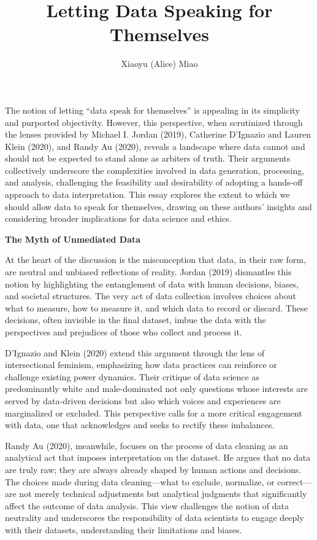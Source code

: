 \documentclass[
  letterpaper,
  DIV=11,
  numbers=noendperiod]{scrartcl}
\title{Letting Data Speaking for Themselves}
\author{Xiaoyu (Alice) Miao}
\date{}
\begin{document}
\maketitle

The notion of letting ``data speak for themselves'' is appealing in its
simplicity and purported objectivity. However, this perspective, when
scrutinized through the lenses provided by Michael I. Jordan (2019),
Catherine D'Ignazio and Lauren Klein (2020), and Randy Au (2020),
reveals a landscape where data cannot and should not be expected to
stand alone as arbiters of truth. Their arguments collectively
underscore the complexities involved in data generation, processing, and
analysis, challenging the feasibility and desirability of adopting a
hands-off approach to data interpretation. This essay explores the
extent to which we should allow data to speak for themselves, drawing on
these authors' insights and considering broader implications for data
science and ethics.

\textbf{The Myth of Unmediated Data}

At the heart of the discussion is the misconception that data, in their
raw form, are neutral and unbiased reflections of reality. Jordan (2019)
dismantles this notion by highlighting the entanglement of data with
human decisions, biases, and societal structures. The very act of data
collection involves choices about what to measure, how to measure it,
and which data to record or discard. These decisions, often invisible in
the final dataset, imbue the data with the perspectives and prejudices
of those who collect and process it.

D'Ignazio and Klein (2020) extend this argument through the lens of
intersectional feminism, emphasizing how data practices can reinforce or
challenge existing power dynamics. Their critique of data science as
predominantly white and male-dominated not only questions whose
interests are served by data-driven decisions but also which voices and
experiences are marginalized or excluded. This perspective calls for a
more critical engagement with data, one that acknowledges and seeks to
rectify these imbalances.

Randy Au (2020), meanwhile, focuses on the process of data cleaning as
an analytical act that imposes interpretation on the dataset. He argues
that no data are truly raw; they are always already shaped by human
actions and decisions. The choices made during data cleaning---what to
exclude, normalize, or correct---are not merely technical adjustments
but analytical judgments that significantly affect the outcome of data
analysis. This view challenges the notion of data neutrality and
underscores the responsibility of data scientists to engage deeply with
their datasets, understanding their limitations and biases.
\end{document}
